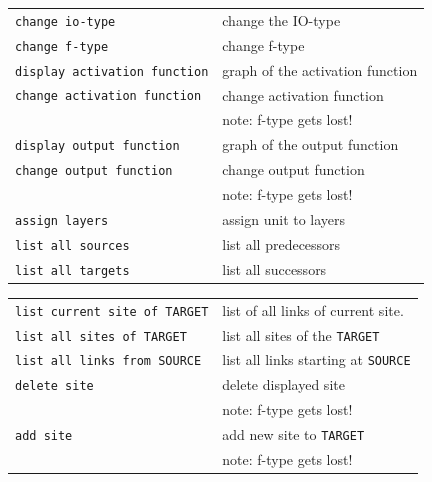 {\newpage
\clearpage
\samepage \begin{tabular}{|l|l|}
\hline
{\tt change io-type}    & change the IO-type\\ 
{\tt change f-type}     & change f-type\\ 
{\tt display activation function} 
                        &  graph of the activation function\\ 
{\tt change activation function} 
                        &  change activation function\\ 
                        & note: f-type gets lost!\\ 
{\tt display output function} 
                        &  graph of the output function\\ 
{\tt change output function} 
                        & change output function\\ 
                        & note: f-type gets lost!\\ 
{\tt assign layers}     & assign unit to layers\\ 
{\tt list all sources}  & list all predecessors\\ 
{\tt list all targets}  & list all successors\\ 
\hline
\end{tabular}
}

{\newpage
\clearpage
\samepage {}
}

{\newpage
\clearpage
\samepage {}
}

{\newpage
\clearpage
\samepage \begin{tabular}{|l|l|}
\hline
{\tt list current site of TARGET} 
                        & list of all links of current site.\\ 
{\tt list all sites of TARGET} 
                        & list all sites of the {\tt TARGET}\\ 
{\tt list all links from SOURCE} 
                        & list all links starting at {\tt SOURCE}\\ 
{\tt delete site}       & delete displayed site\\ 
                        & note: f-type gets lost!\\ 
{\tt add site}          & add new site to {\tt TARGET}\\ 
                        & note: f-type gets lost!\\ 
\hline
\end{tabular}
}

{\newpage
\clearpage
\samepage {}
}


